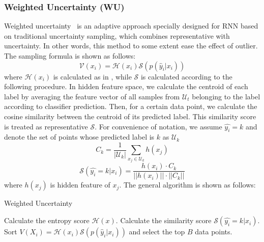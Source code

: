 \subsubsection{Weighted Uncertainty (WU)}
    Weighted uncertainty~\cite{zhao2017deep} is an adaptive approach specially designed for RNN based on traditional uncertainty sampling, which combines representative with uncertainty. In other words, this method to some extent ease the effect of outlier. The sampling formula is shown as follows:
    $$ \mathcal{V}(x_i) = \mathcal{H}(x_i) \mathcal{S}(p(\hat{y}_i|x_i))$$
    where $\mathcal{H}(x_i)$ is calculated as in , while $\mathcal{S}$ is calculated according to the following procedure. 
    In hidden feature space, we calculate the centroid of each label by averaging the feature vector of all samples from $\mathcal{U}_t$ belonging to the label according to classifier prediction. Then, for a certain data point, we calculate the cosine similarity between the centroid of its predicted label. This similarity score is treated as representative $\mathcal{S}$.  For convenience of notation, we assume $\hat{y_i} = k$ and denote the set of points whose predicted label is $k$ as $\mathcal{U}_k$
    $$C_k = \frac{1}{|\mathcal{U}_k|} \sum_{x_j \in \mathcal{U}_k} h(x_j)$$
    $$\mathcal{S}(\hat{y_i} = k|x_i) = \frac{h(x_i) \cdot C_k}{||h(x_i)|| \cdot ||C_k||} $$
where $h(x_j)$ is hidden feature of $x_j$.
 The general algorithm is shown as follows:
 \begin{algorithm}
\caption{Weighted Uncertainty}
\label{alg:WU}
\begin{algorithmic}
\REPEAT 
\STATE Calculate the entropy score $\mathcal{H}(x)$.
\STATE Calculate the similarity score $\mathcal{S}(\hat{y_i} = k|x_i)$.
\STATE Sort $V(X_i) = \mathcal{H}(x_i) \mathcal{S}(p(\hat{y}_i|x_i)) $ and select the top $B$ data points.
\end{algorithmic}
\end{algorithm}

